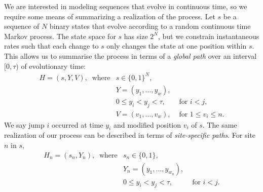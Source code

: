 \documentclass[11pt]{article}
\begin{document}
We are interested in modeling sequences that evolve in continuous
time, so we require some means of summarizing a realization of the
process. Let $s$ be a sequence of $N$ binary states that evolve
according to a random continuous time Markov process. The state space
for $s$ has size $2^N$, but we constrain instantaneous rates such that
each change to $s$ only changes the state at one position within $s$.
This allows us to summarise the process in terms of a {\it global
  path} over an interval $[0,\tau)$ of evolutionary time:
\[
\begin{array}{lll}
H = (s, Y, V), ~\mbox{ where} & s \in \{0,1\}^N,\\
                             & Y = (y_1, \ldots, y_w),\\
                             & 0\leq y_i < y_{j} < \tau, & \mbox{ for } i < j,\\
                             & V = (v_1,\ldots, v_w), & \mbox{ for } 1\leq v_i\leq n.
\end{array}
\]
We say jump $i$ occurred at time $y_i$ and modified position $v_i$ of $s$.
The same realization of our process can be described in terms of {\it
  site-specific paths}. For site $n$ in $s$,
\[
\begin{array}{lll}
H_n = (s_n, Y_n), ~\mbox{ where} & s_n \in \{0,1\},\\
                                & Y_n = (y_1, \ldots, y_{w_n}),\\
                                & 0\leq y_i < y_{j} < \tau, & \mbox{ for } i < j.
\end{array}
\]

\end{document}
